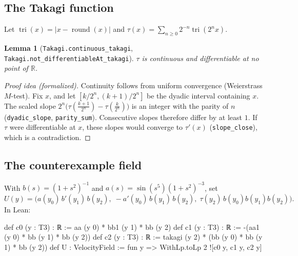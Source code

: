 \documentclass[11pt,a4paper]{article}
\newtheorem{lemma}[theorem]{Lemma}
\theoremstyle{definition}
\theoremstyle{remark}
\newcommand{\R}{\mathbb{R}}
\newcommand{\lean}[1]{\texttt{#1}}
\begin{document}
\subsection{The Takagi function}
Let $\operatorname{tri}(x)=|x-\operatorname{round}(x)|$ and $\tau(x)=\sum_{n\ge0}2^{-n}\operatorname{tri}(2^nx)$.

\begin{lemma}[\lean{Takagi.continuous\_takagi}, \lean{Takagi.not\_differentiableAt\_takagi}]
$\tau$ is continuous and differentiable at no point of $\R$.
\end{lemma}
\begin{proof}[Proof idea (formalized)]
Continuity follows from uniform convergence (Weierstrass $M$-test). Fix $x$, and let $[k/2^n,(k+1)/2^n]$ be the dyadic interval containing $x$. The scaled slope $2^n\bigl(\tau(\frac{k+1}{2^n})-\tau(\frac{k}{2^n})\bigr)$ is an integer with the parity of $n$ (\lean{dyadic\_slope}, \lean{parity\_sum}). Consecutive slopes therefore differ by at least $1$. If $\tau$ were differentiable at $x$, these slopes would converge to $\tau'(x)$ (\lean{slope\_close}), which is a contradiction.
\end{proof}

\subsection{The counterexample field}
With $b(s)=(1+s^2)^{-1}$ and $a(s)=\sin(s^5)(1+s^2)^{-3}$, set
\[
U(y)=\bigl(a(y_0)\,b'(y_1)\,b(y_2),\; -a'(y_0)\,b(y_1)\,b(y_2),\; \tau(y_2)\,b(y_0)b(y_1)b(y_2)\bigr).
\]
In Lean:
\begin{leancode}
def c0 (y : T3) : ℝ := aa (y 0) * bb1 (y 1) * bb (y 2)
def c1 (y : T3) : ℝ := -(aa1 (y 0) * bb (y 1) * bb (y 2))
def c2 (y : T3) : ℝ := takagi (y 2) * (bb (y 0) * bb (y 1) * bb (y 2))
def U : VelocityField := fun y => WithLp.toLp 2 ![c0 y, c1 y, c2 y]
\end{leancode}
\end{document}
